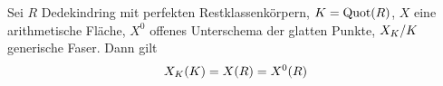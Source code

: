 \documentclass[german, bibliography=totoc]{scrreprt}
\renewcommand*{\optcite}[2][]{}
\begin{document}
\begin{Korollar}\label{thm:ratpkteregulaeremodelle}
  \optcite[Corollary IV.4.4]{silverman2}
  Sei $R$ Dedekindring
  mit perfekten Restklassenkörpern,
  $K=\operatorname{Quot}(R)$,
  $X$ eine arithmetische Fläche,
  $X^0$ offenes Unterschema der glatten Punkte,
  $X_{K}/K$ generische Faser.
  Dann gilt
  \begin{gather*}
    X_{K}(K)=X(R)=X^0(R)
  \end{gather*}


\end{Korollar}
\end{document}
